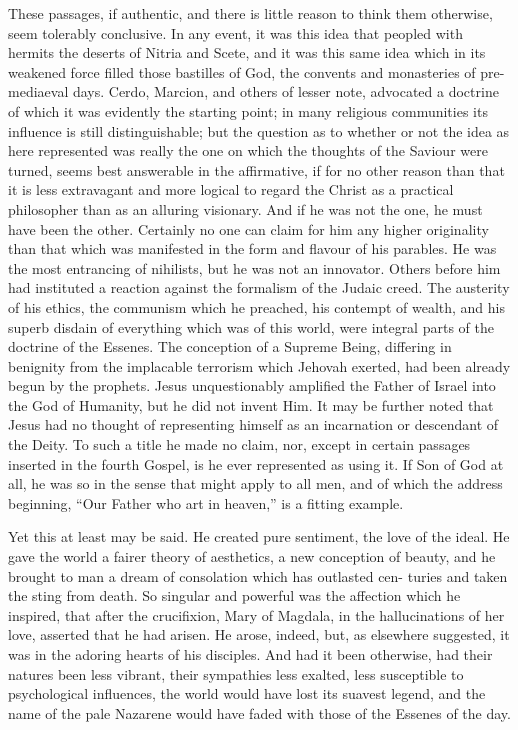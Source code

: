 \documentclass[]{book}
\begin{document}
These passages, if authentic, and there is little reason to think them
otherwise, seem tolerably conclusive. In any event, it was this idea
that peopled with hermits the deserts of Nitria and Scete, and it was
this same idea which in its weakened force filled those bastilles of
God, the convents and monasteries of pre-mediaeval days. Cerdo, Marcion,
and others of lesser note, advocated a doctrine of which it was
evidently the starting point; in many religious communities its
influence is still distinguishable; but the question as to whether or
not the idea as here represented was really the one on which the
thoughts of the Saviour were turned, seems best answerable in the
affirmative, if for no other reason than that it is less extravagant and
more logical to regard the Christ as a practical philosopher than as an
alluring visionary. And if he was not the one, he must have been the
other. Certainly no one can claim for him any higher originality than
that which was manifested in the form and flavour of his parables. He
was the most entrancing of nihilists, but he was not an innovator.
Others before him had instituted a reaction against the formalism of the
Judaic creed. The austerity of his ethics, the communism which he
preached, his contempt of wealth, and his superb disdain of everything
which was of this world, were integral parts of the doctrine of the
Essenes. The conception of a Supreme Being, differing in benignity from
the implacable terrorism which Jehovah exerted, had been already begun
by the prophets. Jesus unquestionably amplified the Father of Israel
into the God of Humanity, but he did not invent Him. It may be further
noted that Jesus had no thought of representing himself as an
incarnation or descendant of the Deity. To such a title he made no
claim, nor, except in certain passages inserted in the fourth Gospel, is
he ever represented as using it. If Son of God at all, he was so in the
sense that might apply to all men, and of which the address beginning,
``Our Father who art in heaven,'' is a fitting example.

Yet this at least may be said. He created pure sentiment, the love of
the ideal. He gave the world a fairer theory of aesthetics, a new
conception of beauty, and he brought to man a dream of consolation which
has outlasted cen- turies and taken the sting from death. So singular
and powerful was the affection which he inspired, that after the
crucifixion, Mary of Magdala, in the hallucinations of her love,
asserted that he had arisen. He arose, indeed, but, as elsewhere
suggested, it was in the adoring hearts of his disciples. And had it
been otherwise, had their natures been less vibrant, their sympathies
less exalted, less susceptible to psychological influences, the world
would have lost its suavest legend, and the name of the pale Nazarene
would have faded with those of the Essenes of the day.
\end{document}
